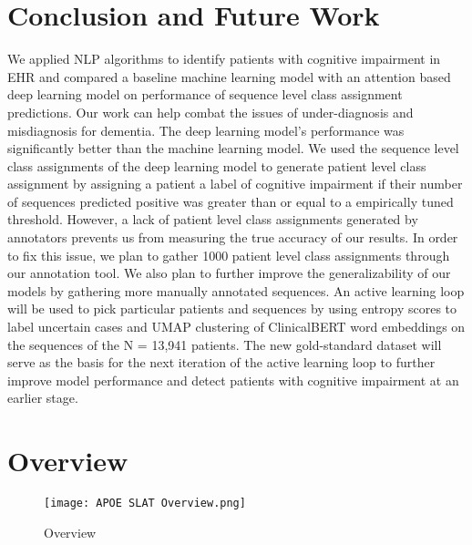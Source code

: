 \documentclass[pmlr,twocolumn,10pt]{jmlr} %
\begin{document}
\section{Conclusion and Future Work} 
\label{sec:ConclusionFutureWork} We applied NLP algorithms to identify patients with cognitive impairment in EHR and
compared a baseline machine learning model with an attention based deep learning model on performance of sequence level class assignment predictions. Our work can help combat the issues of under-diagnosis and misdiagnosis for dementia. The deep learning model's performance was significantly better than the machine learning model. We used the sequence level class assignments of the deep learning model to generate patient level class assignment by assigning a patient a label of cognitive impairment if their number of sequences predicted positive was greater than or equal to a empirically tuned threshold. However, a lack of patient level class assignments generated by annotators prevents us from measuring the true accuracy of our results. In order to fix this issue, we plan to gather 1000 patient level class assignments through our annotation tool. We also plan to further improve the generalizability of our models by gathering more manually annotated sequences. An active learning loop will be used to pick particular patients and sequences by using entropy scores to label uncertain cases and UMAP clustering of ClinicalBERT word embeddings on the sequences of the N = 13,941 patients. The new gold-standard dataset will serve as the basis for the next iteration of the active learning loop to further improve model performance and detect patients with cognitive impairment at an earlier stage.

\clearpage



\nocite{*}

\clearpage

\appendix

\section{Overview}
\begin{figure}[h] \label{app:overview}
\centering 
\texttt{[image: APOE SLAT Overview.png]}
\caption{Overview}

\end{figure}

\clearpage
\end{document}
